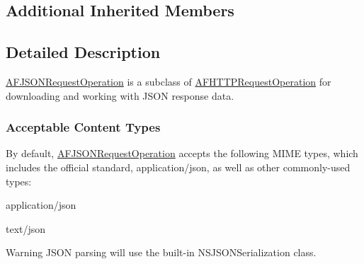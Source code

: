 \subsection*{Additional Inherited Members}


\subsection{Detailed Description}
{\ttfamily \hyperlink{interface_a_f_j_s_o_n_request_operation}{A\-F\-J\-S\-O\-N\-Request\-Operation}} is a subclass of {\ttfamily \hyperlink{interface_a_f_h_t_t_p_request_operation}{A\-F\-H\-T\-T\-P\-Request\-Operation}} for downloading and working with J\-S\-O\-N response data.

\subsubsection*{Acceptable Content Types}

By default, {\ttfamily \hyperlink{interface_a_f_j_s_o_n_request_operation}{A\-F\-J\-S\-O\-N\-Request\-Operation}} accepts the following M\-I\-M\-E types, which includes the official standard, {\ttfamily application/json}, as well as other commonly-\/used types\-:


\begin{DoxyItemize}
\item {\ttfamily application/json}
\item {\ttfamily text/json}
\end{DoxyItemize}

\begin{DoxyWarning}{Warning}
J\-S\-O\-N parsing will use the built-\/in {\ttfamily N\-S\-J\-S\-O\-N\-Serialization} class. 
\end{DoxyWarning}


